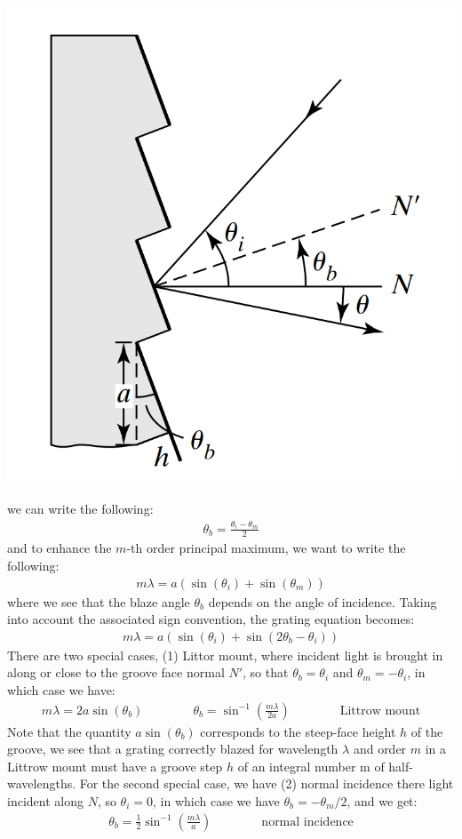 \documentclass[11pt]{book}
\theoremstyle{break}
\theoremstyle{break}
\begin{document}
\begin{center}
\includegraphics[scale=0.35]{blazed.png}
\end{center} 
we can write the following:
\begin{align*}
\theta_b = \frac{\theta_i - \theta_m}{2}
\end{align*}
and to enhance the $m$-th order principal maximum, we want to write the following:
\begin{align*}
m\lambda = a\left(\sin(\theta_i ) + \sin(\theta_m)\right)
\end{align*}
where we see that the blaze angle $\theta_b$ depends on the angle of incidence. Taking into account the associated sign convention, the grating equation becomes:
\begin{align*}
m\lambda = a\left( \sin(\theta_i) +\sin(2\theta_b - \theta_i)\right)
\end{align*}
There are two special cases, (1) Littor mount, where incident light is brought in along or close to the groove face normal $N'$, so that $\theta_b = \theta_i$ and $\theta_m = - \theta_i$, in which case we have:
\begin{align*}
m\lambda = 2a\sin(\theta_b) \qquad\qquad \theta_b = \sin^{-1}\left( \frac{m\lambda}{2a}\right)\qquad\qquad \text{Littrow mount}
\end{align*}
Note that the quantity $a\sin(\theta_b)$ corresponds to the steep-face height $h$ of the groove, we see that a grating correctly blazed for wavelength $\lambda$ and order $m$ in a Littrow mount must have a groove step $h$ of an integral number
m of half-wavelengths. For the second special case, we have (2) normal incidence there light incident along $N$, so $\theta_i = 0$, in which case we have $\theta_b = -\theta_m /2$, and we get:
\begin{align*}
\theta_b = \frac{1}{2}\sin^{-1}\left( \frac{m\lambda}{a}\right) \qquad\qquad \text{normal incidence}
\end{align*}
\end{document}
